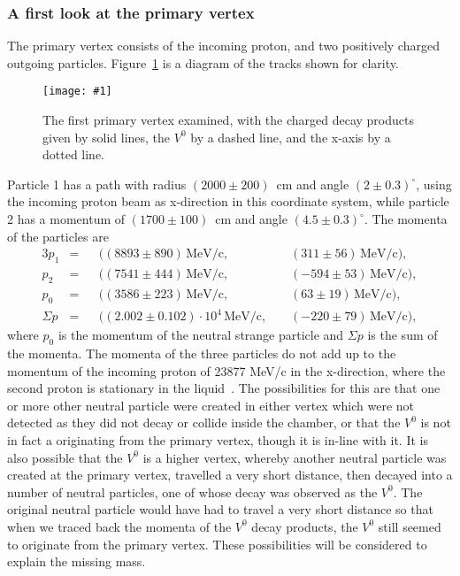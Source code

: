 \documentclass[twocolumn]{article}
\newcommand{\insertFigure}[1]{%
   \texttt{[image: \#1]}%
}
\begin{document}
\subsubsection{A first look at the primary vertex}
The primary vertex consists of the incoming proton, and two positively charged outgoing particles. Figure~\ref{fig:primary1} is a diagram of the tracks shown for clarity.
\begin{figure} [!h]
	\centering
	\insertFigure{Images/primary_1.png}
	\caption{The first primary vertex examined, with the charged decay products given by solid lines, the $V^0$ by a dashed line, and the x-axis by a dotted line.}
	\label{fig:primary1}
\end{figure}
Particle 1 has a path with radius $(2000 \pm 200)$~cm and angle $(2 \pm 0.3)^{\circ}$, using the incoming proton beam as x-direction in this coordinate system, while particle 2 has a momentum of $(1700 \pm 100)$~cm and angle $(4.5 \pm 0.3)^{\circ}$. The momenta of the particles are
\begin{alignat*}{3}
p_1 &= &&((8893 \pm 890)\, \text{MeV/c},\hspace{3pt} && (311 \pm 56)\, \text{MeV/c}),\\
p_2 &= &&((7541 \pm 444)\, \text{MeV/c},\hspace{3pt} && (-594 \pm 53)\, \text{MeV/c}),\\
p_0 &= &&((3586 \pm 223)\, \text{MeV/c},\hspace{3pt} && (63 \pm 19)\, \text{MeV/c}),\\[6pt]
\Sigma p &= &&((2.002 \pm 0.102) \cdot 10^4\, \text{MeV/c},\hspace{3pt} && (-220 \pm 79)\, \text{MeV/c}),
\end{alignat*}
where $p_0$ is the momentum of the neutral strange particle and $\Sigma p$ is the sum of the momenta. The momenta of the three particles do not add up to the momentum of the incoming proton of 23877 MeV/c in the x-direction, where the second proton is stationary in the liquid~\cite{seul}. The possibilities for this are that one or more other neutral particle were created in either vertex which were not detected as they did not decay or collide inside the chamber, or that the $V^0$ is not in fact a originating from the primary vertex, though it is in-line with it. It is also possible that  the $V^0$ is a higher vertex, whereby another neutral particle was created at the primary vertex, travelled a very short distance, then decayed into a number of neutral particles, one of whose decay was observed as the $V^0$. The original neutral particle would have had to travel a very short distance so that when we traced back the momenta of the $V^0$ decay products, the $V^0$ still seemed to originate from the primary vertex. These possibilities will be considered to explain the missing mass.
\end{document}
